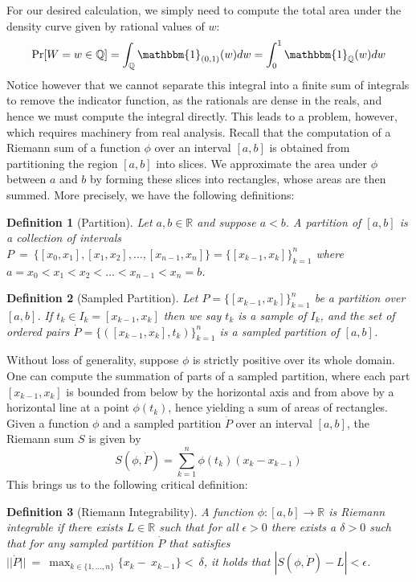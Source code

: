 \documentclass[10pt, oneside]{article}
\newcommand{\R}{\mathbb{R}}
\newcommand{\Q}{\mathbb{Q}}
\newtheorem{defn}{Definition}
\begin{document}
For our desired calculation, we simply need to compute the total area under the density curve given by rational values of $w$:
$$\Pr[W=w\in\Q]=\int_{\Q}\mathbbm{1}_{(0,1)}(w)dw=\int_{0}^{1}\mathbbm{1}_{\Q}(w)dw$$
Notice however that we cannot separate this integral into a finite sum of integrals to remove the indicator function, as the rationals are dense in the reals, and hence we must compute the integral directly.
This leads to a problem, however, which requires machinery from real analysis.
Recall that the computation of a Riemann sum of a function $\phi$ over an interval $[a,b]$ is obtained from partitioning the region $[a,b]$ into slices.
We approximate the area under $\phi$ between $a$ and $b$ by forming these slices into rectangles, whose areas are then summed.
More precisely, we have the following definitions:
\begin{defn}[Partition]
\label{defn:partition}
Let $a,b\in \R$ and suppose $a<b$. A partition of $[a,b]$ is a collection of intervals $P~=~\{[x_0,x_1],[x_1,x_2],\ldots,[x_{n-1},x_n]\}=\{[x_{k-1},x_{k}]\}_{k=1}^n$ where $a=x_0<x_1<x_2<\ldots<x_{n-1}<x_n=b$.
\end{defn}
\begin{defn}[Sampled Partition]
\label{defn:samplepartition}
Let $P=\{[x_{k-1},x_{k}]\}_{k=1}^n$ be a partition over $[a,b]$. If $t_k \in I_k=[x_{k-1},x_k]$ then we say $t_k$ is a sample of $I_k$, and the set of ordered pairs $\dot{P}=\{([x_{k-1},x_{k}],t_k)\}_{k=1}^n$ is a sampled partition of $[a,b]$.
\end{defn}
Without loss of generality, suppose $\phi$ is strictly positive over its whole domain.
One can compute the summation of parts of a sampled partition, where each part $[x_{k-1},x_k]$ is bounded from below by the horizontal axis and from above by a horizontal line at a point $\phi(t_k)$, hence yielding a sum of areas of rectangles.
Given a function $\phi$ and a sampled partition $\dot{P}$ over an interval $[a,b]$, the Riemann sum $S$ is given by 
$$S(\phi,\dot{P})=\sum_{k=1}^n\phi(t_k)(x_k-x_{k-1})$$
This brings us to the following critical definition:
\begin{defn}[Riemann Integrability]
\label{defn:riemann}
A function $\phi:[a,b]\to \R$ is Riemann integrable if there exists $L\in \R$ such that for all $\epsilon>0$ there exists a $\delta >0$ such that for any sampled partition $\dot{P}$ that satisfies $||\dot{P}||~=~\max_{k\in\{1,\ldots,n\}}\{x_{k}-~x_{k-1}\}<~\delta$, it holds that $|S(\phi,\dot{P})-L|<\epsilon$.
\end{defn}
\end{document}
